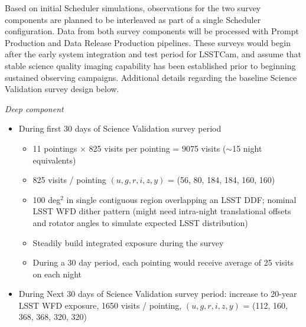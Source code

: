 Based on initial Scheduler simulations, observations for the two survey components are planned to be interleaved as part of a single Scheduler configuration.
Data from both survey components will be processed with Prompt Production and Data Release Production pipelines.
These surveys would begin after the early system integration and test period for LSSTCam, and assume that stable science quality imaging capability has been established prior to beginning sustained observing campaigns.
Additional details regarding the baseline Science Validation survey design below.

\textit{Deep component}

\begin{itemize}

        \item During first 30 days of Science Validation survey period

        \begin{itemize}

                \item 11 pointings $\times$ 825 visits per pointing = 9075 visits ($\sim$15 night equivalents)
                \item 825 visits / pointing $(u, g, r, i, z, y)$ = (56, 80, 184, 184, 160, 160)
                \item 100 deg$^2$ in single contiguous region overlapping an LSST DDF; nominal LSST WFD dither pattern (might need intra-night translational offsets and rotator angles to simulate expected LSST distribution)
                \item Steadily build integrated exposure during the survey
                \item During a 30 day period, each pointing would receive average of 25 visits on each night

        \end{itemize}

        \item During Next 30 days of Science Validation survey period: increase to 20-year LSST WFD exposure, 1650 visits / pointing, $(u, g, r, i, z, y)$ = (112, 160, 368, 368, 320, 320)

\end{itemize}

